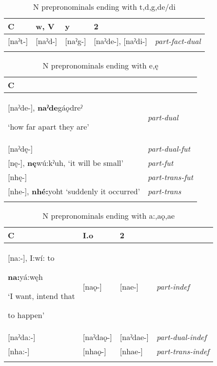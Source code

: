 
\begin{table}
\caption{N prepronominals ending with t,d,g,de/di}
\label{tab:1:partfactdual}
\scriptsize{
\begin{tabularx}{\textwidth}{XXXXX}
\lsptoprule
C & w, V & y & 2 & \\
\midrule
{}[naˀt-] & [naˀd-] & [naˀg-] & [naˀde-], [naˀdi-] & {\itshape part-fact-dual}\\
\lspbottomrule
\end{tabularx}}
\end{table}



\begin{table}
\caption{N prepronominals ending with e,ę}
\label{tab:1:partother}
\scriptsize{
\begin{tabularx}{\textwidth}{XX}
\lsptoprule
C & \\
\midrule
{}[naˀde-], \textbf{naˀde}gáǫdreˀ 

‘how far apart they are’ & {\itshape part-dual}\\

{}[naˀdę-] & {\itshape part-dual-fut}\\

{}[nę-], \textbf{nę}wú:kˀuh, ‘it will be small’ & {\itshape part-fut}\\

{}[nhę-] & {\itshape part-trans-fut}\\

{}[nhe-], \textbf{nhé:}yoht ‘suddenly it occurred’ & {\itshape part-trans}\\
\lspbottomrule
\end{tabularx}}
\end{table}



\begin{table}
\caption{N prepronominals ending with a:,aǫ,ae}
\label{tab:1:partdualtransindef}
\scriptsize{
\begin{tabularx}{\textwidth}{XXXX}
\lsptoprule
C & I.o & 2 & \\
\midrule
{}[na:-], I:wí: to 

\textbf{na:}yá:węh 

‘I want, intend that 

to happen’ & [naǫ-] & [nae-] & {\itshape part-indef}\\
\midrule
{}[naˀda:-] & [naˀdaǫ-] & [naˀdae-] & {\itshape part-dual-indef}\\
\midrule
{}[nha:-] & [nhaǫ-] & [nhae-] & {\itshape part-trans-indef}\\
\lspbottomrule
\end{tabularx}}
\end{table}


